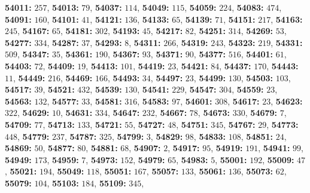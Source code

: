 \textsf{\bfseries 54011:} $257$, \textsf{\bfseries 54013:} $79$, \textsf{\bfseries 54037:} $114$, \textsf{\bfseries 54049:} $115$, \textsf{\bfseries 54059:} $224$, \textsf{\bfseries 54083:} $474$, \textsf{\bfseries 54091:} $160$, \textsf{\bfseries 54101:} $41$, \textsf{\bfseries 54121:} $136$, \textsf{\bfseries 54133:} $65$, \textsf{\bfseries 54139:} $71$, \textsf{\bfseries 54151:} $217$, \textsf{\bfseries 54163:} $245$, \textsf{\bfseries 54167:} $65$, \textsf{\bfseries 54181:} $302$, \textsf{\bfseries 54193:} $45$, \textsf{\bfseries 54217:} $82$, \textsf{\bfseries 54251:} $314$, \textsf{\bfseries 54269:} $53$, \textsf{\bfseries 54277:} $334$, \textsf{\bfseries 54287:} $37$, \textsf{\bfseries 54293:} $8$, \textsf{\bfseries 54311:} $266$, \textsf{\bfseries 54319:} $243$, \textsf{\bfseries 54323:} $219$, \textsf{\bfseries 54331:} $509$, \textsf{\bfseries 54347:} $35$, \textsf{\bfseries 54361:} $190$, \textsf{\bfseries 54367:} $93$, \textsf{\bfseries 54371:} $90$, \textsf{\bfseries 54377:} $516$, \textsf{\bfseries 54401:} $61$, \textsf{\bfseries 54403:} $72$, \textsf{\bfseries 54409:} $19$, \textsf{\bfseries 54413:} $101$, \textsf{\bfseries 54419:} $23$, \textsf{\bfseries 54421:} $84$, \textsf{\bfseries 54437:} $170$, \textsf{\bfseries 54443:} $11$, \textsf{\bfseries 54449:} $216$, \textsf{\bfseries 54469:} $166$, \textsf{\bfseries 54493:} $34$, \textsf{\bfseries 54497:} $23$, \textsf{\bfseries 54499:} $130$, \textsf{\bfseries 54503:} $103$, \textsf{\bfseries 54517:} $39$, \textsf{\bfseries 54521:} $432$, \textsf{\bfseries 54539:} $130$, \textsf{\bfseries 54541:} $229$, \textsf{\bfseries 54547:} $304$, \textsf{\bfseries 54559:} $23$, \textsf{\bfseries 54563:} $132$, \textsf{\bfseries 54577:} $33$, \textsf{\bfseries 54581:} $316$, \textsf{\bfseries 54583:} $97$, \textsf{\bfseries 54601:} $308$, \textsf{\bfseries 54617:} $23$, \textsf{\bfseries 54623:} $322$, \textsf{\bfseries 54629:} $10$, \textsf{\bfseries 54631:} $334$, \textsf{\bfseries 54647:} $232$, \textsf{\bfseries 54667:} $78$, \textsf{\bfseries 54673:} $330$, \textsf{\bfseries 54679:} $7$, \textsf{\bfseries 54709:} $77$, \textsf{\bfseries 54713:} $133$, \textsf{\bfseries 54721:} $55$, \textsf{\bfseries 54727:} $48$, \textsf{\bfseries 54751:} $345$, \textsf{\bfseries 54767:} $29$, \textsf{\bfseries 54773:} $448$, \textsf{\bfseries 54779:} $237$, \textsf{\bfseries 54787:} $325$, \textsf{\bfseries 54799:} $3$, \textsf{\bfseries 54829:} $98$, \textsf{\bfseries 54833:} $108$, \textsf{\bfseries 54851:} $24$, \textsf{\bfseries 54869:} $50$, \textsf{\bfseries 54877:} $80$, \textsf{\bfseries 54881:} $68$, \textsf{\bfseries 54907:} $2$, \textsf{\bfseries 54917:} $95$, \textsf{\bfseries 54919:} $191$, \textsf{\bfseries 54941:} $99$, \textsf{\bfseries 54949:} $173$, \textsf{\bfseries 54959:} $7$, \textsf{\bfseries 54973:} $152$, \textsf{\bfseries 54979:} $65$, \textsf{\bfseries 54983:} $5$, \textsf{\bfseries 55001:} $192$, \textsf{\bfseries 55009:} $47$, \textsf{\bfseries 55021:} $194$, \textsf{\bfseries 55049:} $118$, \textsf{\bfseries 55051:} $167$, \textsf{\bfseries 55057:} $133$, \textsf{\bfseries 55061:} $136$, \textsf{\bfseries 55073:} $62$, \textsf{\bfseries 55079:} $104$, \textsf{\bfseries 55103:} $184$, \textsf{\bfseries 55109:} $345$, 
